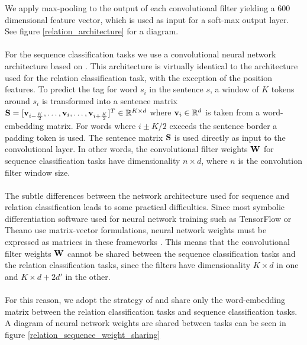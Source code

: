 We apply max-pooling to the output of each convolutional filter yielding a 600 dimensional feature vector, which is used as input for a soft-max output layer. See figure \ref{relation_architecture} for a diagram.
\\\\
For the sequence classification tasks we use a convolutional neural network architecture based on \citet{collobert2011}. This architecture is virtually identical to the architecture used for the relation classification task, with the exception of the position features. To predict the tag for word $s_i$ in the sentence $s$, a window of $K$ tokens around $s_i$ is transformed into a sentence matrix $\mathbf{S} = [\mathbf{v}_{i - \frac{K}{2}},\dots,\mathbf{v}_i,\dots,\mathbf{v}_{i + \frac{K}{2}}]^T \in \mathbb{R}^{K \times d}$ where $\mathbf{v}_i \in \mathbb{R}^d$ is taken from a word-embedding matrix. For words where $i \pm K / 2$ exceeds the sentence border a padding token is used. The sentence matrix $\mathbf{S}$ is used directly as input to the convolutional layer. In other words, the convolutional filter weights $\mathbf{W}$ for sequence classification tasks have dimensionality $n \times d$, where $n$ is the convolution filter window size.
\\\\
The subtle differences between the network architecture used for sequence and relation classification leads to some practical difficulties. Since most symbolic differentiation software used for neural network training such as TensorFlow or Theano use matrix-vector formulations, neural network weights must be expressed as matrices in these frameworks \citep{abadi2016, theano2016}. This means that the convolutional filter weights $\mathbf{W}$ cannot be shared between the sequence classification tasks and the relation classification tasks, since the filters have dimensionality $K \times d$ in one and $K \times d + 2d'$ in the other.
\\\\
For this reason, we adopt the strategy of \citet{collobert2008} and share only the word-embedding matrix between the relation classification tasks and sequence classification tasks. A diagram of neural network weights are shared between tasks can be seen in figure \ref{relation_sequence_weight_sharing}
\newpage
